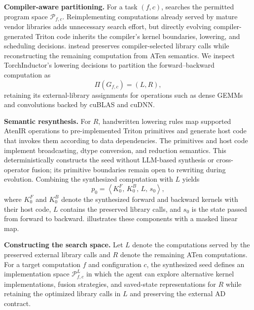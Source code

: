 \noindent\textbf{Compiler-aware partitioning.}
For a task $(f,c)$, \method searches the permitted program space $\mathcal{P}_{f,c}$. Reimplementing computations already served by mature vendor libraries adds unnecessary search effort, but directly evolving compiler-generated Triton code inherits the compiler's kernel boundaries, lowering, and scheduling decisions. \method instead preserves compiler-selected library calls while reconstructing the remaining computation from ATen semantics.
We inspect TorchInductor's lowering decisions to partition the forward--backward computation as
\begin{equation}
    \Pi(G_{f,c}) = (L,R),
    \label{eq:partition}
\end{equation}
retaining its external-library assignments for operations such as dense GEMMs and convolutions backed by cuBLAS and cuDNN.

\noindent\textbf{Semantic resynthesis.}
For $R$, handwritten lowering rules map supported AtenIR operations to pre-implemented Triton primitives and generate host code that invokes them according to data dependencies. The primitives and host code implement broadcasting, dtype conversion, and reduction semantics. This deterministically constructs the seed without LLM-based synthesis or cross-operator fusion; its primitive boundaries remain open to rewriting during evolution. Combining the synthesized computation with $L$ yields
\begin{equation}
    p_0 =
    \left\langle
        K_0^F,\,
        K_0^B,\,
        L,\,
        s_0
    \right\rangle,
    \label{eq:seed_program}
\end{equation}
where $K_0^F$ and $K_0^B$ denote the synthesized forward and backward kernels with their host code, $L$ contains the preserved library calls, and $s_0$ is the state passed from forward to backward.  illustrates these components with a masked linear map.

\noindent\textbf{Constructing the search space.} 
Let $L$ denote the computations served by the preserved external library calls and $R$ denote the remaining ATen computations. For a target computation $f$ and configuration $c$, the synthesized seed defines an implementation space $\mathcal{P}_{f,c}^{L}$ in which the agent can explore alternative kernel implementations, fusion strategies, and saved-state representations for $R$ while retaining the optimized library calls in $L$ and preserving the external AD contract.


